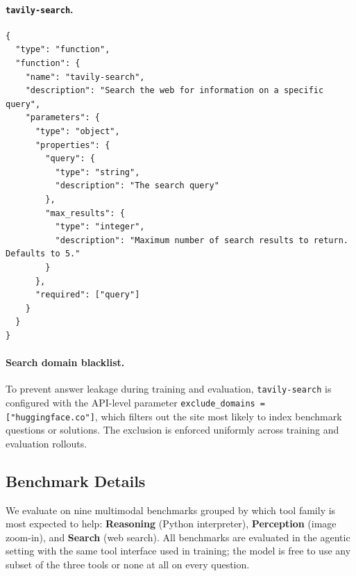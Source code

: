 \documentclass{llmxive}
\begin{document}
\paragraph{\texttt{tavily-search}.}
\begin{Verbatim}[fontsize=\small, breaklines=true, breakanywhere=true, breakindent=2em]
{
  "type": "function",
  "function": {
    "name": "tavily-search",
    "description": "Search the web for information on a specific query",
    "parameters": {
      "type": "object",
      "properties": {
        "query": {
          "type": "string",
          "description": "The search query"
        },
        "max_results": {
          "type": "integer",
          "description": "Maximum number of search results to return. Defaults to 5."
        }
      },
      "required": ["query"]
    }
  }
}
\end{Verbatim}

\paragraph{Search domain blacklist.}
To prevent answer leakage during training and evaluation, \texttt{tavily-search} is configured with the API-level parameter \texttt{exclude\_domains = ["huggingface.co"]}, which filters out the site most likely to index benchmark questions or solutions. The exclusion is enforced uniformly across training and evaluation rollouts.

\subsection{Benchmark Details}
\label{app:benchmarks}

We evaluate on nine multimodal benchmarks grouped by which tool family is most expected to help: \textbf{Reasoning} (Python interpreter), \textbf{Perception} (image zoom-in), and \textbf{Search} (web search). All benchmarks are evaluated in the agentic setting with the same tool interface used in training; the model is free to use any subset of the three tools or none at all on every question.
\end{document}

